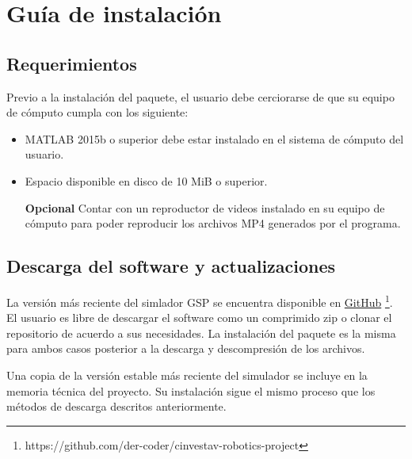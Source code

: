 \chapter{Guía de instalación}

\section{Requerimientos}
Previo a la instalación del paquete, el usuario debe cerciorarse de que su 
equipo de cómputo cumpla con los siguiente:

\begin{itemize}
 \item MATLAB 2015b o superior debe estar instalado en el sistema de cómputo del 
usuario.

 \item Espacio disponible en disco de 10 MiB o superior.
 \item [\textbf{Opcional}] Contar con un reproductor de videos 
instalado en su equipo de cómputo para poder reproducir los archivos MP4 
generados por el programa.
\end{itemize}


\section{Descarga del software y actualizaciones}
La versión más reciente del simlador GSP se encuentra disponible en 
\href{https://github.com/der-coder/cinvestav-robotics-project/tree/master}{GitHub} 
\footnote{https://github.com/der-coder/cinvestav-robotics-project}. El usuario es
libre de descargar el software como un comprimido zip o clonar el repositorio de 
acuerdo a sus necesidades. La instalación del paquete es la misma para ambos casos
posterior a la descarga y descompresión de los archivos.

Una copia de la versión estable más reciente del simulador se incluye en la memoria
técnica del proyecto. Su instalación sigue el mismo proceso que los métodos de descarga
descritos anteriormente.

